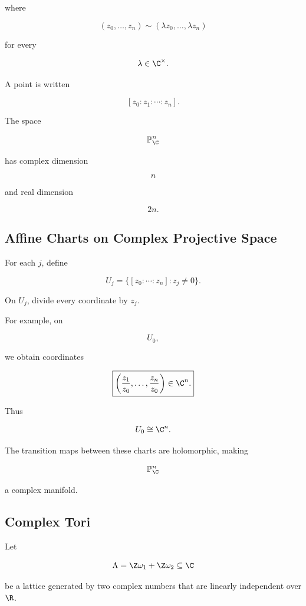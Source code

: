 where

\[
(z_0,\ldots,z_n)
\sim
(\lambda z_0,\ldots,\lambda z_n)
\]

for every

\[
\lambda\in\C^\times.
\]

A point is written

\[
\boxed{
[z_0:z_1:\cdots:z_n].
}
\]

The space

\[
\mathbb{P}^n_{\C}
\]

has complex dimension

\[
\boxed{n}
\]

and real dimension

\[
\boxed{2n.}
\]

\subsection{Affine Charts on Complex Projective Space}
\label{subsec:complex-projective-affine-charts}

For each \(j\), define

\[
U_j
=
\{
[z_0:\cdots:z_n]:
z_j\neq0
\}.
\]

On \(U_j\), divide every coordinate by \(z_j\).

For example, on

\[
U_0,
\]

we obtain coordinates

\[
\boxed{
\left(
\frac{z_1}{z_0},
\ldots,
\frac{z_n}{z_0}
\right)\in\C^n.
}
\]

Thus

\[
U_0\cong\C^n.
\]

The transition maps between these charts are holomorphic, making

\[
\mathbb{P}^n_{\C}
\]

a complex manifold.

\subsection{Complex Tori}
\label{subsec:complex-tori}

Let

\[
\Lambda
=
\Z\omega_1+\Z\omega_2
\subseteq\C
\]

be a lattice generated by two complex numbers that are linearly independent
over \(\R\).

